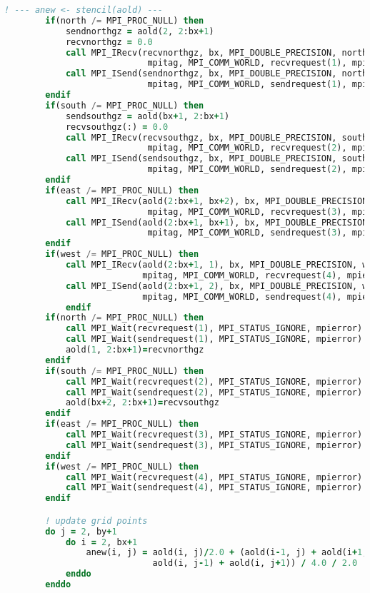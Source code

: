 \begin{lstlisting}[language=Fortran, caption={Parallel F2PY implementation of the stencil test case - F90 module code.}]
        ! --- anew <- stencil(aold) ---
        if(north /= MPI_PROC_NULL) then 
            sendnorthgz = aold(2, 2:bx+1)
            recvnorthgz = 0.0
            call MPI_IRecv(recvnorthgz, bx, MPI_DOUBLE_PRECISION, north,  &
                            mpitag, MPI_COMM_WORLD, recvrequest(1), mpierror)
            call MPI_ISend(sendnorthgz, bx, MPI_DOUBLE_PRECISION, north,  &
                            mpitag, MPI_COMM_WORLD, sendrequest(1), mpierror)
        endif   
        if(south /= MPI_PROC_NULL) then 
            sendsouthgz = aold(bx+1, 2:bx+1)
            recvsouthgz(:) = 0.0
            call MPI_IRecv(recvsouthgz, bx, MPI_DOUBLE_PRECISION, south,  &
                            mpitag, MPI_COMM_WORLD, recvrequest(2), mpierror)
            call MPI_ISend(sendsouthgz, bx, MPI_DOUBLE_PRECISION, south,  &
                            mpitag, MPI_COMM_WORLD, sendrequest(2), mpierror)
        endif    
        if(east /= MPI_PROC_NULL) then 
            call MPI_IRecv(aold(2:bx+1, bx+2), bx, MPI_DOUBLE_PRECISION, east, &
                            mpitag, MPI_COMM_WORLD, recvrequest(3), mpierror)
            call MPI_ISend(aold(2:bx+1, bx+1), bx, MPI_DOUBLE_PRECISION, east, &
                            mpitag, MPI_COMM_WORLD, sendrequest(3), mpierror)
        endif    
        if(west /= MPI_PROC_NULL) then 
            call MPI_IRecv(aold(2:bx+1, 1), bx, MPI_DOUBLE_PRECISION, west, &
                           mpitag, MPI_COMM_WORLD, recvrequest(4), mpierror)
            call MPI_ISend(aold(2:bx+1, 2), bx, MPI_DOUBLE_PRECISION, west, &
                           mpitag, MPI_COMM_WORLD, sendrequest(4), mpierror)
            endif
        if(north /= MPI_PROC_NULL) then 
            call MPI_Wait(recvrequest(1), MPI_STATUS_IGNORE, mpierror)
            call MPI_Wait(sendrequest(1), MPI_STATUS_IGNORE, mpierror)
            aold(1, 2:bx+1)=recvnorthgz
        endif
        if(south /= MPI_PROC_NULL) then 
            call MPI_Wait(recvrequest(2), MPI_STATUS_IGNORE, mpierror)
            call MPI_Wait(sendrequest(2), MPI_STATUS_IGNORE, mpierror)
            aold(bx+2, 2:bx+1)=recvsouthgz
        endif
        if(east /= MPI_PROC_NULL) then 
            call MPI_Wait(recvrequest(3), MPI_STATUS_IGNORE, mpierror)
            call MPI_Wait(sendrequest(3), MPI_STATUS_IGNORE, mpierror)
        endif
        if(west /= MPI_PROC_NULL) then 
            call MPI_Wait(recvrequest(4), MPI_STATUS_IGNORE, mpierror)
            call MPI_Wait(sendrequest(4), MPI_STATUS_IGNORE, mpierror)
        endif  

        ! update grid points
        do j = 2, by+1 
            do i = 2, bx+1
                anew(i, j) = aold(i, j)/2.0 + (aold(i-1, j) + aold(i+1, j) +  &
                             aold(i, j-1) + aold(i, j+1)) / 4.0 / 2.0
            enddo
        enddo


\end{lstlisting}
